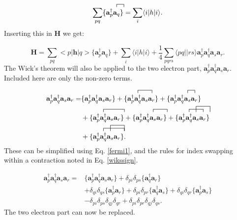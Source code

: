 \documentclass[a4paper,norsk,11pt,twoside]{report}
\begin{document}
\begin{equation}
\sum_{pq}
\{\contraction{}{\textbf{a}^{\dag}_p}{}{\textbf{a}_q}
\textbf{a}^{\dag}_p \textbf{a}_q \} = \sum_i \langle i|h|i \rangle .
\end{equation}
Inserting this in $\textbf{H}$ we get:

\begin{equation}
\textbf{H} = \sum_{pq} <p|\textbf{h}|q> 
\{\textbf{a}^{\dag}_p \textbf{a}_q \}
+ \sum_i \langle i|h|i \rangle
 + 
\frac{1}{4} \sum_{pqrs} \langle pq||rs \rangle \textbf{a}^{\dag}_p \textbf{a}^{\dag}_q \textbf{a}_s \textbf{a}_r . \label{temp_h}
\end{equation}
The Wick's theorem will also be applied to the two electron part, $\textbf{a}^{\dag}_p \textbf{a}^{\dag}_q \textbf{a}_s \textbf{a}_r$. Included here are only the non-zero terms.

\begin{align}
\textbf{a}^{\dag}_p \textbf{a}^{\dag}_q \textbf{a}_s \textbf{a}_r = & \{\textbf{a}^{\dag}_p \textbf{a}^{\dag}_q \textbf{a}_s \textbf{a}_r\} 
+ \{
\contraction{}{\textbf{a}^{\dag}_p}{\textbf{a}^{\dag}_q}{\textbf{a}_s}
\textbf{a}^{\dag}_p \textbf{a}^{\dag}_q \textbf{a}_s 
\textbf{a}_r
\}
+ \{
\textbf{a}^{\dag}_p
\contraction{}{\textbf{a}^{\dag}_q}{}{\textbf{a}_s}
\textbf{a}^{\dag}_q \textbf{a}_s 
\textbf{a}_r
\} \nonumber \\ &
+ \{
\contraction{}{\textbf{a}^{\dag}_p}{\textbf{a}^{\dag}_q \textbf{a}_s}{\textbf{a}_r}
\textbf{a}^{\dag}_p \textbf{a}^{\dag}_q \textbf{a}_s 
\textbf{a}_r
\}
+ \{\textbf{a}^{\dag}_p
\contraction{}{\textbf{a}^{\dag}_q}{\textbf{a}_s}{\textbf{a}_r}
\textbf{a}^{\dag}_q \textbf{a}_s \textbf{a}_r
\}
+ \{
\contraction{}{\textbf{a}^{\dag}_p}{\textbf{a}^{\dag}_q}{\textbf{a}_s}
\contraction[2ex]{\textbf{a}^{\dag}_p}{\textbf{a}^{\dag}_q}{\textbf{a}_s}{\textbf{a}_r}
\textbf{a}^{\dag}_p \textbf{a}^{\dag}_q \textbf{a}_s 
\textbf{a}_r
\} \nonumber \\ &
+ \{
\contraction[2ex]{\textbf{a}^{\dag}_p}{\textbf{a}^{\dag}_q}{\textbf{a}_s}{\textbf{a}_r}
\contraction{}{\textbf{a}^{\dag}_p}{\textbf{a}^{\dag}_q \textbf{a}_s}{\textbf{a}_r}
\textbf{a}^{\dag}_p \textbf{a}^{\dag}_q \textbf{a}_s 
\textbf{a}_r
\} . \nonumber
\end{align}
These can be simplified using Eq. \eqref{fermi1}, and the rules for index swapping within a contraction noted in Eq. \eqref{wikssign}.

\begin{align}
\textbf{a}^{\dag}_p \textbf{a}^{\dag}_q \textbf{a}_s \textbf{a}_r = &\{\textbf{a}^{\dag}_p \textbf{a}^{\dag}_q \textbf{a}_s \textbf{a}_r\} 
+ \delta_{pi} \delta_{ps} \{ \textbf{a}^{\dag}_q \textbf{a}_r \}
\nonumber \\ & 
+ \delta_{qi} \delta_{qs}
\{ \textbf{a}^{\dag}_p \textbf{a}_r \}
+ \delta_{pi} \delta_{pr} 
\{ \textbf{a}^{\dag}_q \textbf{a}_s \}
+ \delta_{qi} \delta_{qr}
\{ \textbf{a}^{\dag}_p \textbf{a}_s \} \nonumber \\ &
- \delta_{pi} \delta_{ps} \delta_{qj} \delta_{qr}
+ \delta_{pi} \delta_{pr} \delta_{qj} \delta_{qs} .
\end{align}
The two electron part can now be replaced.
\end{document}
